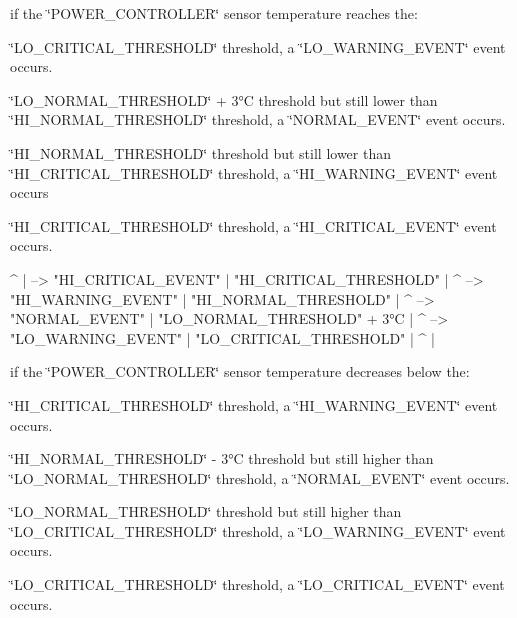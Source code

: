 if the \char`\"{}\+P\+O\+W\+E\+R\+\_\+\+C\+O\+N\+T\+R\+O\+L\+L\+E\+R\char`\"{} sensor temperature reaches the\+:
\begin{DoxyItemize}
\item \char`\"{}\+L\+O\+\_\+\+C\+R\+I\+T\+I\+C\+A\+L\+\_\+\+T\+H\+R\+E\+S\+H\+O\+L\+D\char`\"{} threshold, a \char`\"{}\+L\+O\+\_\+\+W\+A\+R\+N\+I\+N\+G\+\_\+\+E\+V\+E\+N\+T\char`\"{} event occurs.
\item \char`\"{}\+L\+O\+\_\+\+N\+O\+R\+M\+A\+L\+\_\+\+T\+H\+R\+E\+S\+H\+O\+L\+D\char`\"{} + 3°C threshold but still lower than \char`\"{}\+H\+I\+\_\+\+N\+O\+R\+M\+A\+L\+\_\+\+T\+H\+R\+E\+S\+H\+O\+L\+D\char`\"{} threshold, a \char`\"{}\+N\+O\+R\+M\+A\+L\+\_\+\+E\+V\+E\+N\+T\char`\"{} event occurs.
\item \char`\"{}\+H\+I\+\_\+\+N\+O\+R\+M\+A\+L\+\_\+\+T\+H\+R\+E\+S\+H\+O\+L\+D\char`\"{} threshold but still lower than \char`\"{}\+H\+I\+\_\+\+C\+R\+I\+T\+I\+C\+A\+L\+\_\+\+T\+H\+R\+E\+S\+H\+O\+L\+D\char`\"{} threshold, a \char`\"{}\+H\+I\+\_\+\+W\+A\+R\+N\+I\+N\+G\+\_\+\+E\+V\+E\+N\+T\char`\"{} event occurs
\item \char`\"{}\+H\+I\+\_\+\+C\+R\+I\+T\+I\+C\+A\+L\+\_\+\+T\+H\+R\+E\+S\+H\+O\+L\+D\char`\"{} threshold, a \char`\"{}\+H\+I\+\_\+\+C\+R\+I\+T\+I\+C\+A\+L\+\_\+\+E\+V\+E\+N\+T\char`\"{} event occurs.
\end{DoxyItemize}

\begin{DoxyVerb}      ^
      |           --> "HI_CRITICAL_EVENT"
      |
 "HI_CRITICAL_THRESHOLD"
      |
      ^           --> "HI_WARNING_EVENT"
      |
 "HI_NORMAL_THRESHOLD"
      |
      ^           --> "NORMAL_EVENT"
      |
 "LO_NORMAL_THRESHOLD" + 3°C
      |
      ^           --> "LO_WARNING_EVENT"
      |
 "LO_CRITICAL_THRESHOLD"
      |
      ^
      |
\end{DoxyVerb}


if the \char`\"{}\+P\+O\+W\+E\+R\+\_\+\+C\+O\+N\+T\+R\+O\+L\+L\+E\+R\char`\"{} sensor temperature decreases below the\+:
\begin{DoxyItemize}
\item \char`\"{}\+H\+I\+\_\+\+C\+R\+I\+T\+I\+C\+A\+L\+\_\+\+T\+H\+R\+E\+S\+H\+O\+L\+D\char`\"{} threshold, a \char`\"{}\+H\+I\+\_\+\+W\+A\+R\+N\+I\+N\+G\+\_\+\+E\+V\+E\+N\+T\char`\"{} event occurs.
\item \char`\"{}\+H\+I\+\_\+\+N\+O\+R\+M\+A\+L\+\_\+\+T\+H\+R\+E\+S\+H\+O\+L\+D\char`\"{} -\/ 3°C threshold but still higher than \char`\"{}\+L\+O\+\_\+\+N\+O\+R\+M\+A\+L\+\_\+\+T\+H\+R\+E\+S\+H\+O\+L\+D\char`\"{} threshold, a \char`\"{}\+N\+O\+R\+M\+A\+L\+\_\+\+E\+V\+E\+N\+T\char`\"{} event occurs.
\item \char`\"{}\+L\+O\+\_\+\+N\+O\+R\+M\+A\+L\+\_\+\+T\+H\+R\+E\+S\+H\+O\+L\+D\char`\"{} threshold but still higher than \char`\"{}\+L\+O\+\_\+\+C\+R\+I\+T\+I\+C\+A\+L\+\_\+\+T\+H\+R\+E\+S\+H\+O\+L\+D\char`\"{} threshold, a \char`\"{}\+L\+O\+\_\+\+W\+A\+R\+N\+I\+N\+G\+\_\+\+E\+V\+E\+N\+T\char`\"{} event occurs.
\item \char`\"{}\+L\+O\+\_\+\+C\+R\+I\+T\+I\+C\+A\+L\+\_\+\+T\+H\+R\+E\+S\+H\+O\+L\+D\char`\"{} threshold, a \char`\"{}\+L\+O\+\_\+\+C\+R\+I\+T\+I\+C\+A\+L\+\_\+\+E\+V\+E\+N\+T\char`\"{} event occurs.
\end{DoxyItemize}

